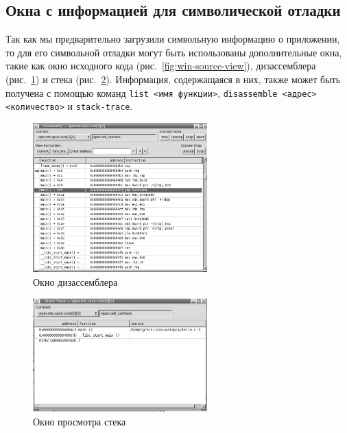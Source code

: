 \subsection{Окна с информацией для символической отладки}

Так как мы предварительно загрузили символьную информацию о приложении, то для его символьной отладки могут быть использованы дополнительные окна, такие как окно исходного кода (рис.~\ref{fig:win-source-view}), дизассемблера (рис.~\ref{fig:win-disassembly}) и стека (рис.~\ref{fig:win-stack-trace}). Информация, содержащаяся в них, также может быть получена с помощью команд \texttt{list <имя функции>}, \texttt{disassemble <адрес> <количество>} и \texttt{stack-trace}.

\begin{figure}[htb]
    \centering
    \includegraphics[width=0.6\textwidth]{./images/win-disassembly.png}
    \caption{Окно дизассемблера}
    \label{fig:win-disassembly}
\end{figure}

\begin{figure}[htb]
    \centering
    \includegraphics[width=0.6\textwidth]{./images/win-stack-trace.png}
    \caption{Окно просмотра стека}
    \label{fig:win-stack-trace}
\end{figure}


